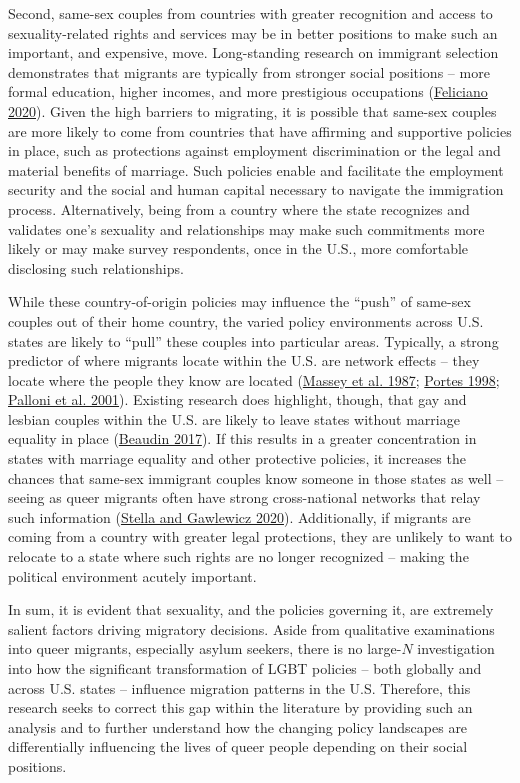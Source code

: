 \documentclass[
  11pt,
]{article}
\begin{document}
Second, same-sex couples from countries with greater recognition and access to sexuality-related rights and services may be in better positions to make such an important, and expensive, move. Long-standing research on immigrant selection demonstrates that migrants are typically from stronger social positions -- more formal education, higher incomes, and more prestigious occupations (\protect\hyperlink{ref-feliciano_2020}{Feliciano 2020}). Given the high barriers to migrating, it is possible that same-sex couples are more likely to come from countries that have affirming and supportive policies in place, such as protections against employment discrimination or the legal and material benefits of marriage. Such policies enable and facilitate the employment security and the social and human capital necessary to navigate the immigration process. Alternatively, being from a country where the state recognizes and validates one's sexuality and relationships may make such commitments more likely or may make survey respondents, once in the U.S., more comfortable disclosing such relationships.

While these country-of-origin policies may influence the ``push'' of same-sex couples out of their home country, the varied policy environments across U.S. states are likely to ``pull'' these couples into particular areas. Typically, a strong predictor of where migrants locate within the U.S. are network effects -- they locate where the people they know are located (\protect\hyperlink{ref-massey_1987}{Massey et al. 1987}; \protect\hyperlink{ref-portes_1998}{Portes 1998}; \protect\hyperlink{ref-palloni_2001}{Palloni et al. 2001}). Existing research does highlight, though, that gay and lesbian couples within the U.S. are likely to leave states without marriage equality in place (\protect\hyperlink{ref-beaudin_2017}{Beaudin 2017}). If this results in a greater concentration in states with marriage equality and other protective policies, it increases the chances that same-sex immigrant couples know someone in those states as well -- seeing as queer migrants often have strong cross-national networks that relay such information (\protect\hyperlink{ref-stella_2020}{Stella and Gawlewicz 2020}). Additionally, if migrants are coming from a country with greater legal protections, they are unlikely to want to relocate to a state where such rights are no longer recognized -- making the political environment acutely important.

In sum, it is evident that sexuality, and the policies governing it, are extremely salient factors driving migratory decisions. Aside from qualitative examinations into queer migrants, especially asylum seekers, there is no large-\(N\) investigation into how the significant transformation of LGBT policies -- both globally and across U.S. states -- influence migration patterns in the U.S. Therefore, this research seeks to correct this gap within the literature by providing such an analysis and to further understand how the changing policy landscapes are differentially influencing the lives of queer people depending on their social positions.
\end{document}
